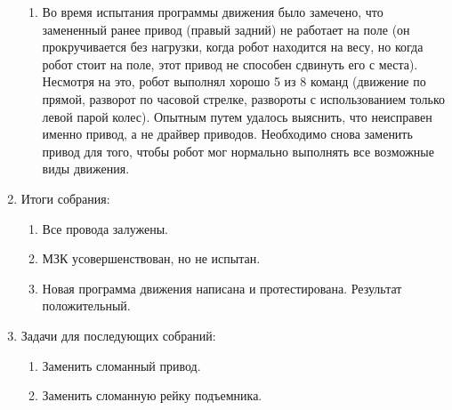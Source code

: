 \begin{enumerate}
\begin{enumerate}
	   \item Во время испытания программы движения было замечено, что замененный ранее привод (правый задний) не работает на поле (он прокручивается без нагрузки, когда робот находится на весу, но когда робот стоит на поле, этот привод не способен сдвинуть его с места). Несмотря на это, робот выполнял хорошо 5 из 8 команд (движение по прямой, разворот по часовой стрелке, развороты с использованием только левой парой колес). Опытным путем удалось выяснить, что неисправен именно привод, а не драйвер приводов. Необходимо снова заменить привод для того, чтобы робот мог нормально выполнять все возможные виды движения.
	   
	\end{enumerate}
	
	\item Итоги собрания:
	\begin{enumerate}
		
		\item Все провода залужены.
		
		\item МЗК усовершенствован, но не испытан.
		
        \item Новая программа движения написана и протестирована. Результат положительный.
		
	\end{enumerate}
	
	\item Задачи для последующих собраний:
	\begin{enumerate}
		
		\item Заменить сломанный привод.
		
		\item Заменить сломанную рейку подъемника.
			
	\end{enumerate}
\end{enumerate}
\fillpage
